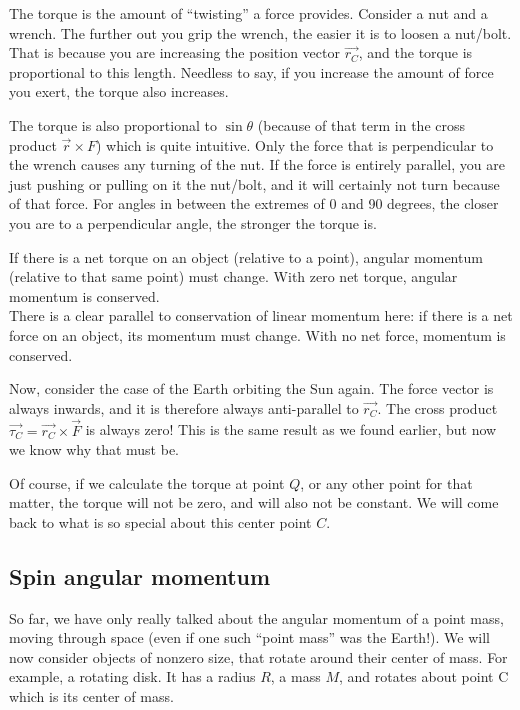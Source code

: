 \documentclass[8.01x]{subfiles}
\begin{document}
The torque is the amount of ``twisting'' a force provides. Consider a nut and a wrench. The further out you grip the wrench, the easier it is to loosen a nut/bolt. That is because you are increasing the position vector $\vec{r_C}$, and the torque is proportional to this length. Needless to say, if you increase the amount of force you exert, the torque also increases.

The torque is also proportional to $\sin \theta$ (because of that term in the cross product $\vec{r} \times {F}$) which is quite intuitive. Only the force that is perpendicular to the wrench causes any turning of the nut. If the force is entirely parallel, you are just pushing or pulling on it the nut/bolt, and it will certainly not turn because of that force. For angles in between the extremes of 0 and 90 degrees, the closer you are to a perpendicular angle, the stronger the torque is.

If there is a net torque on an object (relative to a point), angular momentum (relative to that same point) must change. With zero net torque, angular momentum is conserved.\\
There is a clear parallel to conservation of linear momentum here: if there is a net force on an object, its momentum must change. With no net force, momentum is conserved.

Now, consider the case of the Earth orbiting the Sun again. The force vector is always inwards, and it is therefore always anti-parallel to $\vec{r_C}$. The cross product $\vec{\tau_C} = \vec{r_C} \times \vec{F}$ is always zero! This is the same result as we found earlier, but now we know why that must be.

Of course, if we calculate the torque at point $Q$, or any other point for that matter, the torque will not be zero, and will also not be constant. We will come back to what is so special about this center point $C$.

\subsection{Spin angular momentum}

So far, we have only really talked about the angular momentum of a point mass, moving through space (even if one such ``point mass'' was the Earth!). We will now consider objects of nonzero size, that rotate around their center of mass. For example, a rotating disk. It has a radius $R$, a mass $M$, and rotates about point C which is its center of mass.
\end{document}
